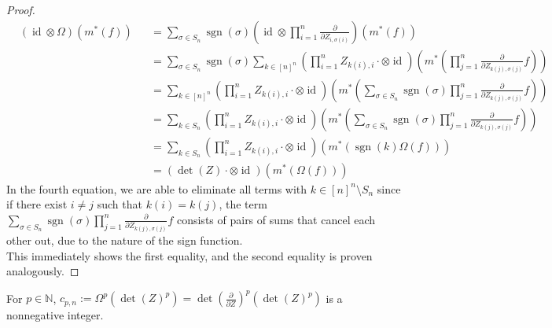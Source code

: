 \begin{proof}
  \begin{equation}
    \begin{aligned}
      &\left( \operatorname{id} \otimes \Omega \right) \left( m^\ast \left( f \right) \right)
      &&= \sum_{\sigma \in S_n} \operatorname{sgn} \left( \sigma \right) \left( \operatorname{id} \otimes \prod_{i=1}^n \frac{\partial}{\partial Z_{i,\sigma \left( i \right)}} \right) \left( m^\ast \left( f \right) \right) \\
      &&&= \sum_{\sigma \in S_n} \operatorname{sgn} \left( \sigma \right) \sum_{k \in [ n ]^n} \left( \prod_{i=1}^n Z_{k(i),i} {\cdot} \otimes \operatorname{id} \right) \left( m^\ast \left( \prod_{j=1}^n \frac{\partial}{\partial Z_{k(j),\sigma (j)}} f \right) \right) \\
      &&&= \sum_{k \in [ n ]^n} \left( \prod_{i=1}^n Z_{k(i),i} {\cdot} \otimes \operatorname{id} \right) \left( m^\ast \left( \sum_{\sigma \in S_n} \operatorname{sgn} \left( \sigma \right) \prod_{j=1}^n \frac{\partial}{\partial Z_{k(j),\sigma (j)}} f \right) \right) \\
      &&&= \sum_{k \in S_n} \left( \prod_{i=1}^n Z_{k(i),i} {\cdot} \otimes \operatorname{id} \right) \left( m^\ast \left( \sum_{\sigma \in S_n} \operatorname{sgn} \left( \sigma \right) \prod_{j=1}^n \frac{\partial}{\partial Z_{k(j),\sigma (j)}} f \right) \right) \\
      &&&= \sum_{k \in S_n} \left( \prod_{i=1}^n Z_{k(i),i} {\cdot} \otimes \operatorname{id} \right) \left( m^\ast \left( \operatorname{sgn} (k) \Omega (f) \right) \right)\\
      &&&= \left( \operatorname{det} (Z) {\cdot} \otimes \operatorname{id} \right) \left( m^\ast \left( \Omega (f) \right) \right)
    \end{aligned}
  \end{equation}
  In the fourth equation, we are able to eliminate all terms with $k \in [n]^n \setminus S_n$ since if there exist $i\neq j$ such that $k(i)=k(j)$, the term $\sum_{\sigma \in S_n} \operatorname{sgn} \left( \sigma \right) \prod_{j=1}^n \frac{\partial}{\partial Z_{k(j),\sigma (j)}} f$ consists of pairs of sums that cancel each other out, due to the nature of the sign function.  \\
  This immediately shows the first equality, and the second equality is proven analogously.
\end{proof}

\begin{lemma}
  For $p \in \mathbb{N} $, $ c_{p,n} := \Omega^p \left( \operatorname{det} (Z)^p \right) = \operatorname{det} \left( \frac{\partial}{\partial Z}\right)^p \left( \operatorname{det} (Z)^p \right)$ is a nonnegative integer.
\end{lemma}

